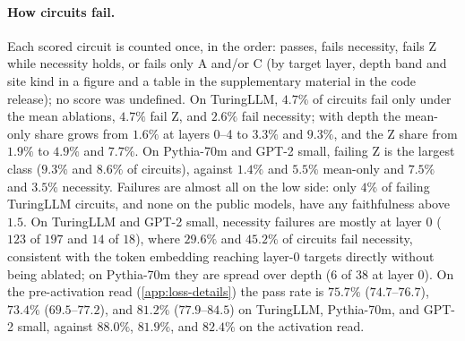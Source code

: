 \documentclass[10pt]{article}
\begin{document}
\paragraph{How circuits fail.}
Each scored circuit is counted once, in the order: passes, fails necessity, fails Z while necessity holds, or fails only A and/or C (by target layer, depth band and site kind in a figure and a table in the supplementary material in the code release); no score was undefined.
On TuringLLM, $4.7\%$ of circuits fail only under the mean ablations, $4.7\%$ fail Z, and $2.6\%$ fail necessity; with depth the mean-only share grows from $1.6\%$ at layers 0--4 to $3.3\%$ and $9.3\%$, and the Z share from $1.9\%$ to $4.9\%$ and $7.7\%$.
On Pythia-70m and GPT-2 small, failing Z is the largest class ($9.3\%$ and $8.6\%$ of circuits), against $1.4\%$ and $5.5\%$ mean-only and $7.5\%$ and $3.5\%$ necessity.
Failures are almost all on the low side: only $4\%$ of failing TuringLLM circuits, and none on the public models, have any faithfulness above $1.5$.
On TuringLLM and GPT-2 small, necessity failures are mostly at layer 0 ($123$ of $197$ and $14$ of $18$), where $29.6\%$ and $45.2\%$ of circuits fail necessity, consistent with the token embedding reaching layer-0 targets directly without being ablated; on Pythia-70m they are spread over depth ($6$ of $38$ at layer 0).
On the pre-activation read (\cref{app:loss-details}) the pass rate is $75.7\%$ ($74.7$--$76.7$), $73.4\%$ ($69.5$--$77.2$), and $81.2\%$ ($77.9$--$84.5$) on TuringLLM, Pythia-70m, and GPT-2 small, against $88.0\%$, $81.9\%$, and $82.4\%$ on the activation read.
\end{document}
